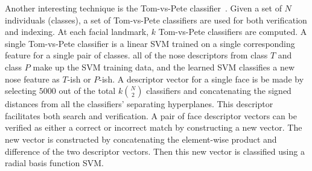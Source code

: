         Another interesting technique is the Tom-vs-Pete classifier~\cite{berg_tom_vs_pete_2012}. Given a set of $N$
        individuals (classes), a set of Tom-vs-Pete classifiers are used for both verification and indexing. At
        each facial landmark, $k$ Tom-vs-Pete classifiers are computed. A single Tom-vs-Pete classifier is a linear
        SVM trained on a single corresponding feature for a single pair of classes. \Eg{} all of the nose
        descriptors from class $T$ and class $P$ make up the SVM training data, and the learned SVM classifies a
        new nose feature as $T$-ish or $P$-ish. A descriptor vector for a single face is be made by selecting
        $5000$ out of the total $k\binom{N}{2}$ classifiers and concatenating the signed distances from all the
        classifiers' separating hyperplanes. This descriptor facilitates both search and verification. A pair of
        face descriptor vectors can be verified as either a correct or incorrect match by constructing a new
        vector. The new vector is constructed by concatenating the element-wise product and difference of the two
        descriptor vectors. Then this new vector is classified using a radial basis function SVM{}.

